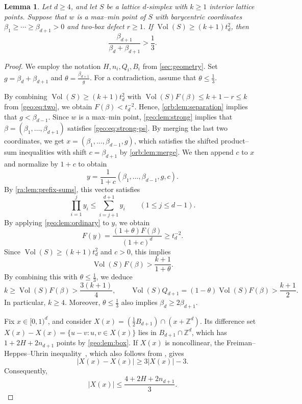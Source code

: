 \documentclass[reqno, 11pt]{article}
\numberwithin{equation}{section}
\newtheorem{lemma}[lemma]{Lemma}
\theoremstyle{definition}
\newcommand{\Z}{\mathbb Z}
\begin{document}
\begin{lemma}\label{bal:lem:direct}
Let $d\ge4$, and let $S$ be a lattice $d$-simplex
with $k\ge1$ interior lattice points.
Suppose that $w$ is a max--min point of $S$
with barycentric coordinates
$\beta_1\ge\cdots\ge\beta_{d+1}>0$
and two-box defect $r\ge1$.
If $\operatorname{Vol}(S)\ge(k+1)t_d^2$, then
\[
\frac{\beta_{d+1}}{\beta_d+\beta_{d+1}}>\frac13.
\]
\end{lemma}
\begin{proof}
We employ the notation $H,n_i,Q_i,B_i$ from \cref{sec:geometry}. 
Set $g=\beta_d+\beta_{d+1}$ and
$\theta=\frac{\beta_{d+1}}{g}$. For a contradiction, assume that $\theta\le\frac{1}{3}$.


By combining $\operatorname{Vol}(S)\ge(k+1)t_d^2$ with $\operatorname{Vol}(S)F(\beta)\le k+1-r\le k$ from \eqref{geo:eq:two}, we obtain $F(\beta)<t_d^{-2}$. Hence, \cref{orb:lem:separation} implies that $g<\beta_{d-1}$. Since $w$ is a max--min point, \cref{geo:lem:strong}
implies that $\beta=(\beta_1,\ldots,\beta_{d+1})$
satisfies \eqref{geo:eq:strong-ps}.
By merging the last two coordinates, we get $x=(\beta_1,\ldots,\beta_{d-1},g)$, which satisfies
the shifted product--sum inequalities with shift
$c=\beta_{d+1}$ by \cref{orb:lem:merge}.
We then append $c$ to $x$ and normalize by $1+c$ to obtain
\[
y=\frac{1}{1+c}(\beta_1,\ldots,\beta_{d-1},g,c).
\]
By \cref{ra:lem:prefix-sums}, this vector satisfies
\[
\prod_{i=1}^j y_i
\le \sum_{i=j+1}^{d+1}y_i
\qquad(1\le j\le d-1).
\]
By applying \cref{geo:lem:ordinary} to $y$, we obtain
\[
F(y)=\frac{(1+\theta)F(\beta)}{(1+c)^d}\ge t_d^{-2}.
\]
Since $\operatorname{Vol}(S)\ge(k+1)t_d^2$ and $c>0$, this implies
\[
\operatorname{Vol}(S)F(\beta)>\frac{k+1}{1+\theta}.
\]
By combining this with $\theta\le\frac{1}{3}$, we deduce
\begin{equation}\label{eq:5.1}
k\ge \operatorname{Vol}(S)F(\beta)>\frac{3(k+1)}4,
\qquad
\operatorname{Vol}(S)Q_{d+1}=(1-\theta)\operatorname{Vol}(S)F(\beta)>\frac{k+1}{2}.
\end{equation}
In particular, $k\ge4$. Moreover, $\theta\le\frac{1}{3}$ also implies $\beta_d\ge2\beta_{d+1}$.


Fix $x\in[0,1)^d$, and consider $X(x)=(\frac12B_{d+1})\cap(x+\Z^d)$.
Its difference set $X(x)-X(x)=\{u-v:u,v\in X(x)\}$ lies in $B_{d+1}\cap\Z^d$,
which has $1+2H+2n_{d+1}$ points by \cref{geo:lem:box}.
If $X(x)$ is noncollinear, the Freiman–Heppes–Uhrin inequality~\cite{FHU}, which also follows from \cite[Theorem~2.1]{GMH16}, gives
\[
|X(x)-X(x)|\ge3|X(x)|-3.
\]
Consequently,
\[
|X(x)|\le\frac{4+2H+2n_{d+1}}{3}.
\]




\end{proof}
\end{document}
